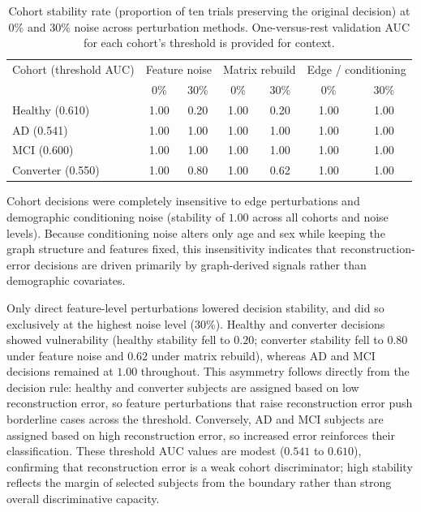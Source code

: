 \begin{table}[htbp]
\centering
\footnotesize
\caption{Cohort stability rate (proportion of ten trials preserving the original decision) at 0\% and 30\% noise across perturbation methods. One-versus-rest validation \ac{AUC} for each cohort's threshold is provided for context.}
\label{tab:rq7-perturbation}
\begin{tabular}{@{}lcccccc@{}}
\toprule
Cohort (threshold \ac{AUC}) & \multicolumn{2}{c}{Feature noise} & \multicolumn{2}{c}{Matrix rebuild} & \multicolumn{2}{c}{Edge / conditioning} \\
 & 0\% & 30\% & 0\% & 30\% & 0\% & 30\% \\
\midrule
Healthy (0.610) & 1.00 & 0.20 & 1.00 & 0.20 & 1.00 & 1.00 \\
\ac{AD} (0.541) & 1.00 & 1.00 & 1.00 & 1.00 & 1.00 & 1.00 \\
\ac{MCI} (0.600) & 1.00 & 1.00 & 1.00 & 1.00 & 1.00 & 1.00 \\
Converter (0.550) & 1.00 & 0.80 & 1.00 & 0.62 & 1.00 & 1.00 \\
\bottomrule
\end{tabular}
\end{table}

Cohort decisions were completely insensitive to edge perturbations and demographic conditioning noise (stability of $1.00$ across all cohorts and noise levels). Because conditioning noise alters only age and sex while keeping the graph structure and features fixed, this insensitivity indicates that reconstruction-error decisions are driven primarily by graph-derived signals rather than demographic covariates.

Only direct feature-level perturbations lowered decision stability, and did so exclusively at the highest noise level (30\%). Healthy and converter decisions showed vulnerability (healthy stability fell to $0.20$; converter stability fell to $0.80$ under feature noise and $0.62$ under matrix rebuild), whereas \ac{AD} and \ac{MCI} decisions remained at $1.00$ throughout. This asymmetry follows directly from the decision rule: healthy and converter subjects are assigned based on low reconstruction error, so feature perturbations that raise reconstruction error push borderline cases across the threshold. Conversely, \ac{AD} and \ac{MCI} subjects are assigned based on high reconstruction error, so increased error reinforces their classification. These threshold \ac{AUC} values are modest ($0.541$ to $0.610$), confirming that reconstruction error is a weak cohort discriminator; high stability reflects the margin of selected subjects from the boundary rather than strong overall discriminative capacity.

